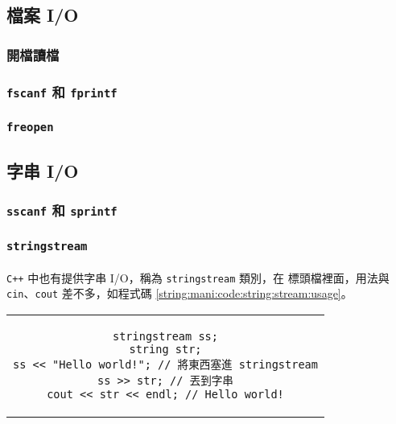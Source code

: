 \documentclass[12pt,a4paper,oneside]{report}
\begin{document}
\begin{CJK}{UTF8}{bkai}
\subsection{檔案 I/O}

\subsubsection{開檔讀檔}
\subsubsection{\lstinline!fscanf! 和 \lstinline!fprintf!}
\subsubsection{\lstinline!freopen!}

\subsection{字串 I/O}

\subsubsection{\lstinline!sscanf! 和 \lstinline!sprintf!}

\subsubsection{\lstinline!stringstream!}

\paragraph{}\texttt{C++} 中也有提供字串 I/O，稱為 \lstinline!stringstream! 類別，在  標頭檔裡面，用法與 \lstinline!cin!、\lstinline!cout! 差不多，如程式碼 \ref{string:mani:code:string:stream:usage}。

\begin{code}[h!]
  \centering
  \begin{tabular}{c}
  \begin{lstlisting}
stringstream ss;
string str;
ss << "Hello world!"; // 將東西塞進 stringstream
ss >> str; // 丟到字串
cout << str << endl; // Hello world!
  \end{lstlisting}
  \end{tabular}
  \caption{\lstinline!stringstream! 基本用法}
  \label{string:mani:code:string:stream:usage}
\end{code}


\end{CJK}
\end{document}
